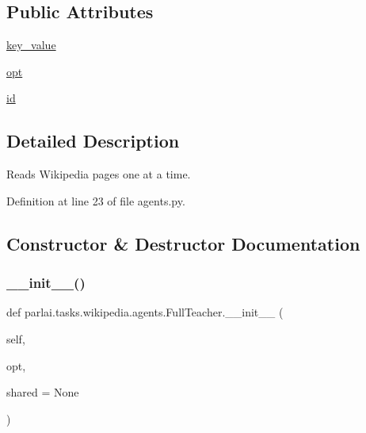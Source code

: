 \subsection*{Public Attributes}
\begin{DoxyCompactItemize}
\item 
\hyperlink{classparlai_1_1tasks_1_1wikipedia_1_1agents_1_1FullTeacher_ad868c50f3a789ce8f091605630b8f715}{key\+\_\+value}
\item 
\hyperlink{classparlai_1_1tasks_1_1wikipedia_1_1agents_1_1FullTeacher_aa4ceed492ea802e93be6cad4f5a7b322}{opt}
\item 
\hyperlink{classparlai_1_1tasks_1_1wikipedia_1_1agents_1_1FullTeacher_a336be0a2ec18a9d19fd58cc4031c30b6}{id}
\end{DoxyCompactItemize}


\subsection{Detailed Description}
\begin{DoxyVerb}Reads Wikipedia pages one at a time.
\end{DoxyVerb}
 

Definition at line 23 of file agents.\+py.



\subsection{Constructor \& Destructor Documentation}
\mbox{\label{classparlai_1_1tasks_1_1wikipedia_1_1agents_1_1FullTeacher_a51b594b0d89c482575edc4ada9e1edcb}} 
\subsubsection{\texorpdfstring{\+\_\+\+\_\+init\+\_\+\+\_\+()}{\_\_init\_\_()}}
{\footnotesize\ttfamily def parlai.\+tasks.\+wikipedia.\+agents.\+Full\+Teacher.\+\_\+\+\_\+init\+\_\+\+\_\+ (\begin{DoxyParamCaption}\item[{}]{self,  }\item[{}]{opt,  }\item[{}]{shared = {\ttfamily None} }\end{DoxyParamCaption})}



